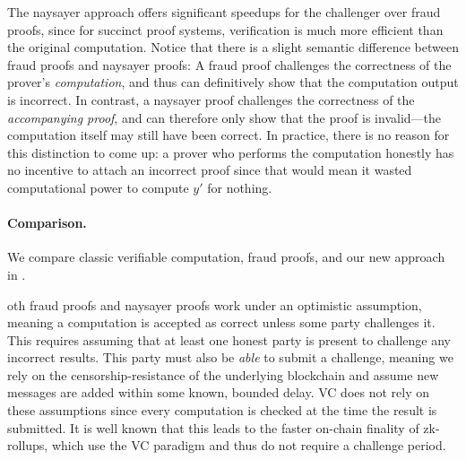 
The naysayer approach offers significant speedups for the challenger over fraud proofs, since for succinct proof systems, verification is much more efficient than the original computation. 
Notice that there is a slight semantic difference between fraud proofs and naysayer proofs: A fraud proof challenges the correctness of the prover's \emph{computation}, and thus can definitively show that the computation output is incorrect. In contrast, a naysayer proof challenges the correctness of the \emph{accompanying proof}, and can therefore only show that the proof is invalid---the computation itself may still have been correct. In practice, there is no reason for this distinction to come up: a prover who performs the computation honestly has no incentive to attach an incorrect proof since that would mean it wasted computational power to compute $y'$ for nothing.





\paragraph{Comparison.} We compare classic verifiable computation, fraud proofs, and our new approach in . 

oth fraud proofs and naysayer proofs work under an optimistic assumption, meaning a computation is accepted as correct unless some party challenges it. This requires assuming that at least one honest party is present to challenge any incorrect results. This party must also be \emph{able} to submit a challenge, meaning we rely on the censorship-resistance of the underlying blockchain and assume new messages are added within some known, bounded delay. VC does not rely on these assumptions since every computation is checked at the time the result is submitted. It is well known that this leads to the faster on-chain finality of zk-rollups, which use the VC paradigm and thus do not require a challenge period.

